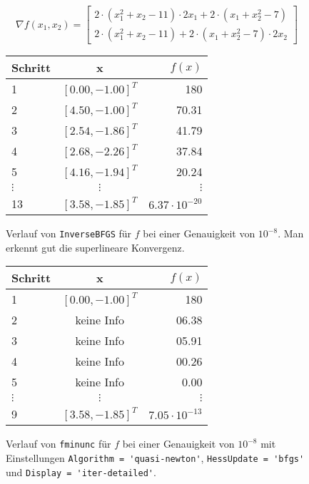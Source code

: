 \documentclass[a4paper, 12pt]{report}
\begin{document}
\def\arraystretch{1.25}
$$\nabla f(x_1, x_2) = \begin{bmatrix} 2\cdot(x_1^2 + x_2 - 11)\cdot 2x_1 + 2\cdot(x_1 + x_2^2 - 7) \\ 
                2\cdot (x_1^2 + x_2 - 11) + 2\cdot(x_1 + x_2^2 - 7)\cdot 2x_2 \end{bmatrix}$$

\begin{figure}[H]
  \centering
  \def\arraystretch{1.25}
  \begin{tabular}{l|c|r}
    \hline
    \textbf{Schritt} & \textbf{x} & \textbf{$f(x)$}\\
    \hline
    1 & $[0.00, -1.00]^T$ & 180\\
    2 & $[4.50, -1.00]^T$ & 70.31\\
    3 & $[2.54, -1.86]^T$ & 41.79\\
    4 & $[2.68, -2.26]^T$ & 37.84\\
    5 & $[4.16, -1.94]^T$ & 20.24\\
    $\vdots$ & $\vdots$ & $\vdots$\\
    13 & $[3.58, -1.85]^T$ & $6.37 \cdot 10^{-20}$\\
    \hline
  \end{tabular}
  \caption{Verlauf von \lstinline[basicstyle=\ttfamily\color{black}]|InverseBFGS| für $f$ bei einer Genauigkeit von $10^{-8}$. Man erkennt
  gut die superlineare Konvergenz.}
\end{figure}

\begin{figure}[H]
  \centering
  \def\arraystretch{1.25}
  \begin{tabular}{l|c|r}
    \hline
    \textbf{Schritt} & \textbf{x} & \textbf{$f(x)$}\\
    \hline
    1 & $[0.00, -1.00]^T$ & 180\\
    2 & keine Info & 06.38\\
    3 & keine Info & 05.91\\
    4 & keine Info & 00.26\\
    5 & keine Info & 0.00\\
    $\vdots$ & $\vdots$ & $\vdots$\\
    9 & $[3.58, -1.85]^T$ & $7.05\cdot 10^{-13}$\\
    \hline
  \end{tabular}
  \caption{Verlauf von \lstinline[basicstyle=\ttfamily\color{black}]|fminunc| für $f$ bei einer Genauigkeit von $10^{-8}$ mit Einstellungen
      \lstinline[basicstyle=\ttfamily\color{black}]|Algorithm = 'quasi-newton'|, \lstinline[basicstyle=\ttfamily\color{black}]|HessUpdate = 'bfgs'|
      und \lstinline[basicstyle=\ttfamily\color{black}]|Display = 'iter-detailed'|.}
\end{figure}
\end{document}

